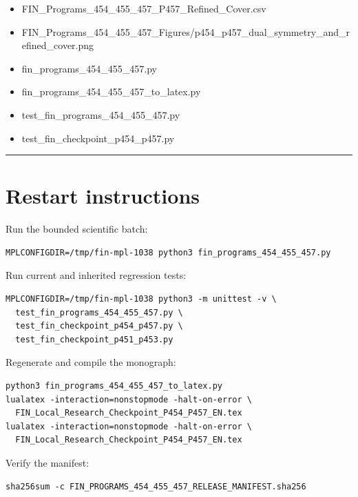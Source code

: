 \documentclass[11pt,a4paper,openany]{report}
\begin{document}
\begin{itemize}
\item 
FIN\_Programs\_454\_455\_457\_P457\_Refined\_Cover.csv

\item 
FIN\_Programs\_454\_455\_457\_Figures/\allowbreak{}p454\_p457\_dual\_symmetry\_and\_refined\_cover.png

\item 
fin\_programs\_454\_455\_457.py

\item 
fin\_programs\_454\_455\_457\_to\_latex.py

\item 
test\_fin\_programs\_454\_455\_457.py

\item 
test\_fin\_checkpoint\_p454\_p457.py

\end{itemize}

\par\medskip\hrule\medskip

\chapter{Restart instructions}

Run the bounded scientific batch:

\begin{Verbatim}[fontsize=\small]
MPLCONFIGDIR=/tmp/fin-mpl-1038 python3 fin_programs_454_455_457.py
\end{Verbatim}

Run current and inherited regression tests:

\begin{Verbatim}[fontsize=\small]
MPLCONFIGDIR=/tmp/fin-mpl-1038 python3 -m unittest -v \
  test_fin_programs_454_455_457.py \
  test_fin_checkpoint_p454_p457.py \
  test_fin_checkpoint_p451_p453.py
\end{Verbatim}

Regenerate and compile the monograph:

\begin{Verbatim}[fontsize=\small]
python3 fin_programs_454_455_457_to_latex.py
lualatex -interaction=nonstopmode -halt-on-error \
  FIN_Local_Research_Checkpoint_P454_P457_EN.tex
lualatex -interaction=nonstopmode -halt-on-error \
  FIN_Local_Research_Checkpoint_P454_P457_EN.tex
\end{Verbatim}

Verify the manifest:

\begin{Verbatim}[fontsize=\small]
sha256sum -c FIN_PROGRAMS_454_455_457_RELEASE_MANIFEST.sha256
\end{Verbatim}
\end{document}
